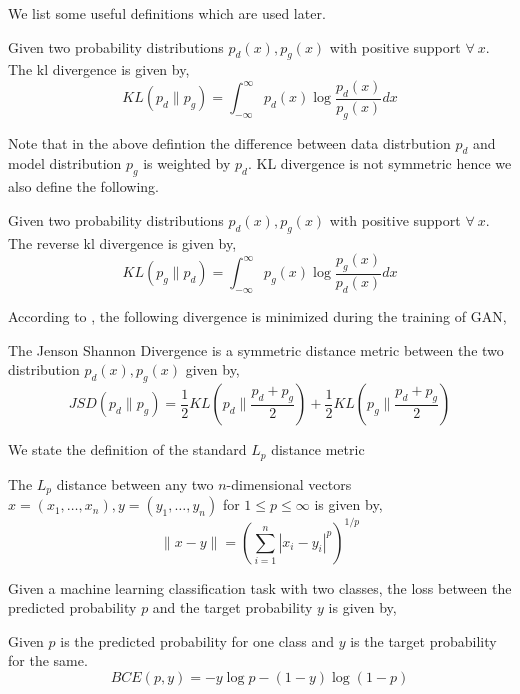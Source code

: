 We list some useful definitions which are used later.
\begin{definition}[KL Divergence]
Given two probability distributions $p_d(x), p_g(x)$ with positive support $\forall \ x$. 
The kl divergence is given by,
\begin{equation}
    \label{eq:kl}
    KL(p_d \parallel p_g) = \int_{-\infty}^{\infty} p_d(x) \log \frac{p_d(x)}{p_g(x)} dx 
\end{equation}{}

\end{definition}{}
Note that in the above defintion the difference between data distrbution $p_d$ and model distribution $p_g$ is weighted by $p_d$. KL divergence is not symmetric hence we also define the following.
\begin{definition}
Given two probability distributions $p_d(x), p_g(x)$ with positive support $\forall \ x$. 
The reverse kl divergence is given by,
\begin{equation}
    \label{eq:rvkl}
    KL(p_g \parallel p_d) = \int_{-\infty}^{\infty} p_g(x) \log \frac{p_g(x)}{p_d(x)} dx
\end{equation}{}


\end{definition}{}
According to \citep{ganGoodfellow}, the following divergence is minimized during the training of GAN,
\begin{definition}
The Jenson Shannon Divergence is a symmetric distance metric between the two distribution $p_d(x), p_g(x)$ given by,
\begin{equation}
    \label{eq:jsd}
    JSD(p_d\parallel p_g) = \frac{1}{2} KL(p_d \parallel \frac{p_d + p_g}{2}) + \frac{1}{2} KL(p_g \parallel \frac{p_d + p_g}{2})
\end{equation}{}


\end{definition}{}

We state the definition of the standard $L_p$ distance metric
\begin{definition}[$L_p$ distance]
\label{def:lp}
The $L_p$ distance between any two $n$-dimensional vectors $x = (x_1, \ldots, x_n), y = (y_1, \ldots, y_n)$ for $1 \leq p \leq \infty$ is given by,
$$\parallel x -y \parallel = (\sum_{i=1}^n |x_i - y_i|^p )^{1/p}$$
\end{definition}{}
Given a machine learning classification task with two classes, the loss between the predicted probability $p$ and the target probability $y$ is given by,
\begin{definition}
\label{def:bce}
Given $p$ is the predicted probability for one class and $y$ is the target probability for the same. 
$$BCE(p, y) = - y \log  p - (1-y)\log (1 - p)$$
\end{definition}{}

